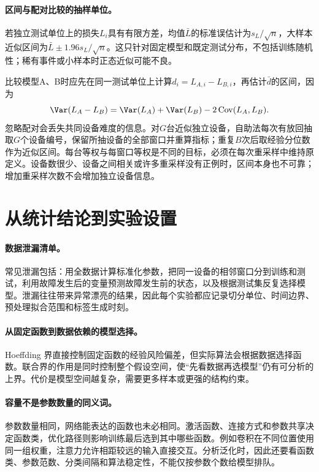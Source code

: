 \paragraph{区间与配对比较的抽样单位。}
若独立测试单位上的损失$L_i$具有有限方差，均值$\bar L$的标准误估计为$s_L/\sqrt n$，大样本近似区间为$\bar L\pm1.96s_L/\sqrt n$。这只针对固定模型和既定测试分布，不包括训练随机性；稀有事件或小样本时正态近似可能不良。

比较模型A、B时应先在同一测试单位上计算$d_i=L_{A,i}-L_{B,i}$，再估计$\bar d$的区间，因为
\begin{equation}
 \Var(L_A-L_B)=\Var(L_A)+\Var(L_B)-2\operatorname{Cov}(L_A,L_B).
\end{equation}
忽略配对会丢失共同设备难度的信息。对$G$台近似独立设备，自助法每次有放回抽取$G$个设备编号，保留所抽设备的全部窗口并重算指标；重复$B$次后取经验分位数作为近似区间。每台等权与每窗口等权是不同的目标，必须在每次重采样中维持原定义。设备数很少、设备之间相关或许多重采样没有正例时，区间本身也不可靠；增加重采样次数不会增加独立设备信息。

\section{从统计结论到实验设置}
\paragraph{数据泄漏清单。}
常见泄漏包括：用全数据计算标准化参数，把同一设备的相邻窗口分到训练和测试，利用故障发生后的变量预测故障发生前的状态，以及根据测试集反复选择模型。泄漏往往带来异常漂亮的结果，因此每个实验都应记录切分单位、时间边界、预处理拟合范围和标签生成时刻。

\paragraph{从固定函数到数据依赖的模型选择。}
Hoeffding 界直接控制固定函数的经验风险偏差，但实际算法会根据数据选择函数。联合界的作用是同时控制整个假设空间，使“先看数据再选模型”仍有可分析的上界。代价是模型空间越复杂，需要更多样本或更强的结构约束。

\paragraph{容量不是参数数量的同义词。}
参数数量相同，网络能表达的函数也未必相同。激活函数、连接方式和参数共享决定函数类，优化路径则影响训练最后选到其中哪些函数。例如卷积在不同位置使用同一组权重，注意力允许相距较远的输入直接交互。分析泛化时，因此还要看函数类、参数范数、分类间隔和算法稳定性，不能仅按参数个数给模型排队。

